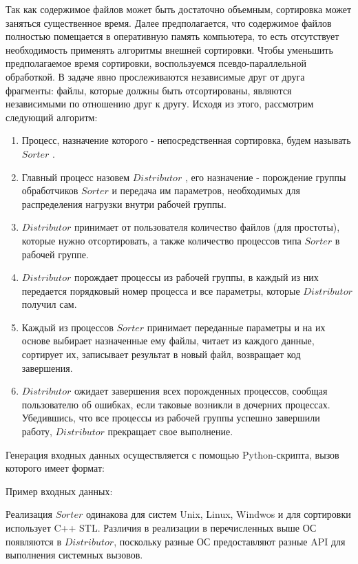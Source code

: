 Так как содержимое файлов может быть достаточно объемным, сортировка может заняться существенное время. Далее предполагается, что содержимое файлов полностью помещается в оперативную память компьютера, то есть отсутствует необходимость применять алгоритмы внешней сортировки. Чтобы уменьшить предполагаемое время сортировки, воспользуемся псевдо-параллельной обработкой. В задаче явно прослеживаются независимые друг от друга фрагменты: файлы, которые должны быть отсортированы, являются независимыми по отношению друг к другу. Исходя из этого, рассмотрим следующий алгоритм:
\begin{enumerate}[label=---]
\item Процесс, назначение которого - непосредственная сортировка, будем называть $Sorter$ \label{practice:sorter}.
\item Главный процесс назовем $Distributor$ \label{practice:distributor}, его назначение - порождение группы обработчиков $Sorter$ и передача им параметров, необходимых для распределения нагрузки внутри рабочей группы.
\item $Distributor$ принимает от пользователя количество файлов (для простоты), которые нужно отсортировать, а также количество процессов типа $Sorter$ в рабочей группе.
\item $Distributor$ порождает процессы из рабочей группы, в каждый из них передается порядковый номер процесса и все параметры, которые $Distributor$ получил сам. 
\item Каждый из процессов $Sorter$ принимает переданные параметры и на их основе выбирает назначенные ему файлы, читает из каждого данные, сортирует их, записывает результат в новый файл, возвращает код завершения.
\item $Distributor$ ожидает завершения всех порожденных процессов, сообщая пользователю об ошибках, если таковые возникли в дочерних процессах. Убедившись, что все процессы из рабочей группы успешно завершили работу, $Distributor$ прекращает свое выполнение.
\end{enumerate}
Генерация входных данных осуществляется с помощью Python-скрипта, вызов которого имеет формат:

Пример входных данных:

Реализация $Sorter$ одинакова для систем Unix, Linux, Windwos и для сортировки использует C++ STL. Различия в реализации в перечисленных выше ОС появляются в $Distributor$, поскольку разные ОС предоставляют разные API для выполнения системных вызовов.